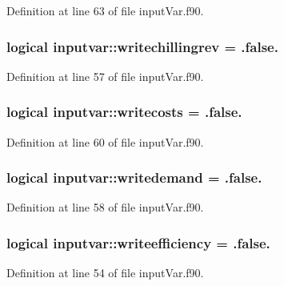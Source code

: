 Definition at line 63 of file input\-Var.\-f90.

\hypertarget{classinputvar_a2d475a99a1a0efcca534104cf8e2efb5}{
\subsubsection[{writechillingrev}]{\setlength{\rightskip}{0pt plus 5cm}logical inputvar\-::writechillingrev = .false.}}\label{classinputvar_a2d475a99a1a0efcca534104cf8e2efb5}


Definition at line 57 of file input\-Var.\-f90.

\hypertarget{classinputvar_a5fa854d48ca73d10b807273f373076b2}{
\subsubsection[{writecosts}]{\setlength{\rightskip}{0pt plus 5cm}logical inputvar\-::writecosts = .false.}}\label{classinputvar_a5fa854d48ca73d10b807273f373076b2}


Definition at line 60 of file input\-Var.\-f90.

\hypertarget{classinputvar_ad6cafaf46b6d0f5bfaeb1ca26ccd0c68}{
\subsubsection[{writedemand}]{\setlength{\rightskip}{0pt plus 5cm}logical inputvar\-::writedemand = .false.}}\label{classinputvar_ad6cafaf46b6d0f5bfaeb1ca26ccd0c68}


Definition at line 58 of file input\-Var.\-f90.

\hypertarget{classinputvar_a7d67f2fa2027e1d60264f442eef9759c}{
\subsubsection[{writeefficiency}]{\setlength{\rightskip}{0pt plus 5cm}logical inputvar\-::writeefficiency = .false.}}\label{classinputvar_a7d67f2fa2027e1d60264f442eef9759c}


Definition at line 54 of file input\-Var.\-f90.

